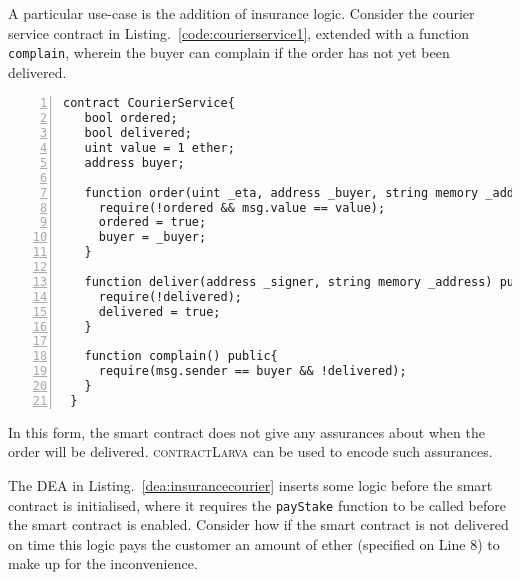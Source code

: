 \documentclass{article}
\newcommand{\contractlarva}{\textsc{contractLarva}\xspace}
\begin{document}
 A particular use-case is the addition of insurance logic. Consider the courier service contract in Listing.~\ref{code:courierservice1}, extended with a function \texttt{complain}, wherein the buyer can complain if the order has not yet been delivered.
 
 
     \small\begin{lstlisting}[language=Solidity,basicstyle=\scriptsize,numbers=left,numbersep=2pt,xleftmargin=0.3cm,label={code:courierservice1},caption={Courier service smart contract extended with a \texttt{complain} function.}]
 contract CourierService{
   bool ordered;
   bool delivered;
   uint value = 1 ether;
   address buyer;
   
   function order(uint _eta, address _buyer, string memory _address) public{
     require(!ordered && msg.value == value);
     ordered = true;
     buyer = _buyer;
   }
   
   function deliver(address _signer, string memory _address) public{
     require(!delivered);
     delivered = true;
   }
 
   function complain() public{
     require(msg.sender == buyer && !delivered);
   }
 }
     \end{lstlisting}\normalsize
   
 In this form, the smart contract does not give any assurances about when the order will be delivered. \contractlarva can be used to encode such assurances.
 
 The DEA in Listing.~\ref{dea:insurancecourier} inserts some logic before the smart contract is initialised, where it requires the \texttt{payStake} function to be called before the smart contract is enabled. Consider how if the smart contract is not delivered on time this logic pays the customer an amount of ether (specified on Line 8) to make up for the inconvenience.
 
\end{document}
